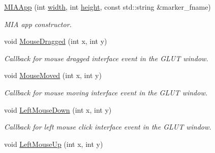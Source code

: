 \begin{DoxyCompactItemize}
\item 
\hyperlink{classimage__tools_1_1MIAApp_a0fbfba996c29b82ef1c208e0ef0b802e}{M\+I\+A\+App} (int \hyperlink{classimage__tools_1_1BaseGfxApp_a2fe403c5392f624477c2ce4429f1a7b5}{width}, int \hyperlink{classimage__tools_1_1BaseGfxApp_aa961e13a7a8e6062204223cc33ac7503}{height}, const std\+::string \&marker\+\_\+fname)\hypertarget{classimage__tools_1_1MIAApp_a0fbfba996c29b82ef1c208e0ef0b802e}{}\label{classimage__tools_1_1MIAApp_a0fbfba996c29b82ef1c208e0ef0b802e}

\begin{DoxyCompactList}\small\item\em M\+IA app constructor. \end{DoxyCompactList}\item 
void \hyperlink{classimage__tools_1_1MIAApp_a22de582c71210c873cde634130478158}{Mouse\+Dragged} (int x, int y)\hypertarget{classimage__tools_1_1MIAApp_a22de582c71210c873cde634130478158}{}\label{classimage__tools_1_1MIAApp_a22de582c71210c873cde634130478158}

\begin{DoxyCompactList}\small\item\em Callback for mouse dragged interface event in the G\+L\+UT window. \end{DoxyCompactList}\item 
void \hyperlink{classimage__tools_1_1MIAApp_afe0b149a45cba12ab1f93d54911caec5}{Mouse\+Moved} (int x, int y)
\begin{DoxyCompactList}\small\item\em Callback for mouse moving interface event in the G\+L\+UT window. \end{DoxyCompactList}\item 
void \hyperlink{classimage__tools_1_1MIAApp_afbfdd2f2d0773e1202c4610ffb077d11}{Left\+Mouse\+Down} (int x, int y)\hypertarget{classimage__tools_1_1MIAApp_afbfdd2f2d0773e1202c4610ffb077d11}{}\label{classimage__tools_1_1MIAApp_afbfdd2f2d0773e1202c4610ffb077d11}

\begin{DoxyCompactList}\small\item\em Callback for left mouse click interface event in the G\+L\+UT window. \end{DoxyCompactList}\item 
void \hyperlink{classimage__tools_1_1MIAApp_a2717842596d33af77f20644527a8b556}{Left\+Mouse\+Up} (int x, int y)\hypertarget{classimage__tools_1_1MIAApp_a2717842596d33af77f20644527a8b556}{}\label{classimage__tools_1_1MIAApp_a2717842596d33af77f20644527a8b556}


\end{DoxyCompactItemize}
